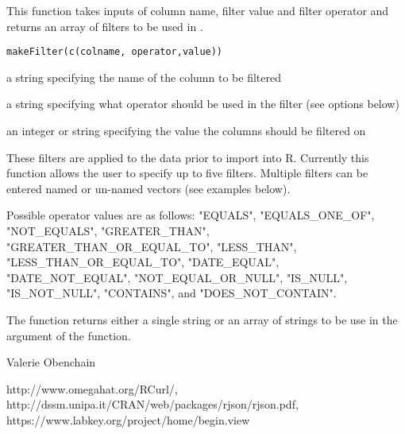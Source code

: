 \documentclass{article}
\begin{document}
\begin{Description}\relax
This function takes inputs of column name, filter value and filter operator and 
returns an array of filters to be used in .
\end{Description}
\begin{Usage}
\begin{verbatim}
makeFilter(c(colname, operator,value))
\end{verbatim}
\end{Usage}
\begin{Arguments}
\begin{ldescription}
\item[\code{colname}] a string specifying the name of the column to be filtered
\item[\code{operator}] a string specifying what operator should be used in the filter (see options below)
\item[\code{value}] an integer or string specifying the value the columns should be filtered on
\end{ldescription}
\end{Arguments}
\begin{Details}\relax
These filters are applied to the data prior to import into R. Currently this function
allows the user to specify up to five filters. Multiple filters can be entered named or
un-named vectors (see examples below).

Possible operator values are as follows:
"EQUALS", "EQUALS\_ONE\_OF", "NOT\_EQUALS", "GREATER\_THAN", "GREATER\_THAN\_OR\_EQUAL\_TO", "LESS\_THAN",
"LESS\_THAN\_OR\_EQUAL\_TO", "DATE\_EQUAL", "DATE\_NOT\_EQUAL", "NOT\_EQUAL\_OR\_NULL",
"IS\_NULL", "IS\_NOT\_NULL", "CONTAINS", and "DOES\_NOT\_CONTAIN".
\end{Details}
\begin{Value}
The function returns either a single string or an array of strings to be use in the
 argument of the  function.
\end{Value}
\begin{Author}\relax
Valerie Obenchain
\end{Author}
\begin{References}\relax
http://www.omegahat.org/RCurl/, \\
http://dssm.unipa.it/CRAN/web/packages/rjson/rjson.pdf,\\
https://www.labkey.org/project/home/begin.view
\end{References}
\end{document}
